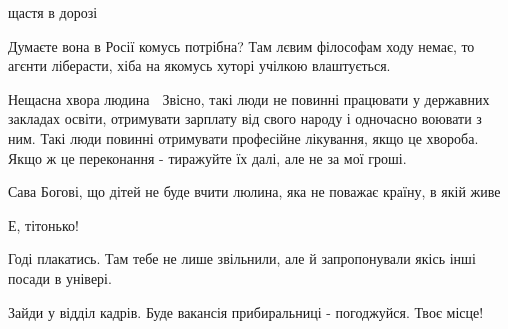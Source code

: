 \begin{itemize}
 
щастя в дорозі

 
Думаєте вона в Росії комусь потрібна? Там лєвим філософам ходу немає, то агєнти ліберасти, хіба на якомусь хуторі учілкою влаштується.

 

Нещасна хвора людина 🙁 Звісно, такі люди не повинні працювати у державних
закладах освіти, отримувати зарплату від свого народу і одночасно воювати з
ним. Такі люди повинні отримувати професійне лікування, якщо це хвороба. Якщо ж
це переконання - тиражуйте їх далі, але не за мої гроші.


 
Сава Богові, що дітей не буде вчити люлина, яка не поважає країну, в якій живе

 

Е, тітонько!

Годі плакатись. Там тебе не лише звільнили, але й запропонували якісь інші
посади в універі.

Зайди у відділ кадрів. Буде вакансія прибиральниці - погоджуйся. Твоє місце!

\begin{itemize}
 

\end{itemize}
\end{itemize}
